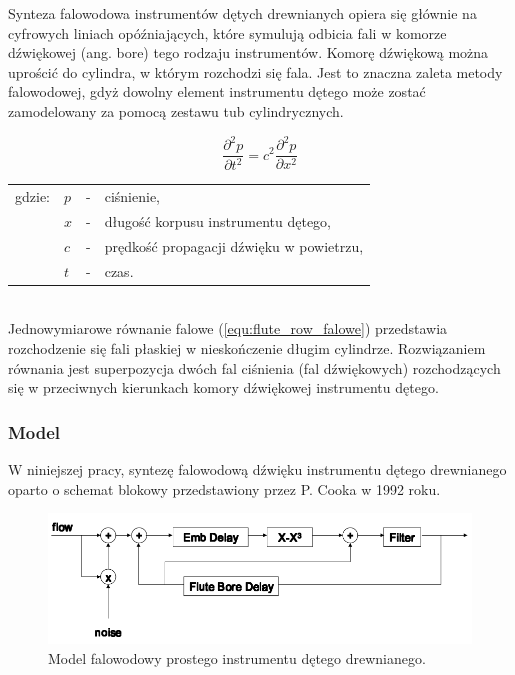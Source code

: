Synteza falowodowa instrumentów dętych drewnianych opiera się głównie na cyfrowych liniach opóźniających, które symulują odbicia fali w komorze dźwiękowej (ang. bore) tego rodzaju instrumentów. Komorę dźwiękową można uprościć do cylindra, w którym rozchodzi się fala. Jest to znaczna zaleta metody falowodowej, gdyż dowolny element instrumentu dętego może zostać zamodelowany za pomocą zestawu tub cylindrycznych.

\begin{equation} \label{equ:flute_row_falowe}
\frac{\partial^2 p}{\partial t^2} = c^{2}\frac{\partial^2 p}{\partial x^2}
\end{equation}
\begin{tabular}{ l l l l}
	gdzie: 	&	$p$ & - &  ciśnienie, \\
	&	$x$ & - &  długość korpusu instrumentu dętego,\\
	&	$c$ & - &  prędkość propagacji dźwięku w powietrzu,\\
	&	$t$ & - &  czas. \\
\end{tabular} \\

Jednowymiarowe równanie falowe (\ref{equ:flute_row_falowe}) przedstawia rozchodzenie się fali płaskiej w nieskończenie długim cylindrze. Rozwiązaniem równania jest superpozycja dwóch fal ciśnienia (fal dźwiękowych) rozchodzących się w przeciwnych kierunkach komory dźwiękowej instrumentu dętego.


\subsubsection{Model}
W niniejszej pracy, syntezę falowodową dźwięku instrumentu dętego drewnianego oparto o schemat blokowy przedstawiony przez P. Cooka w 1992 roku.

\begin{figure}[H]
	\centering
	\includegraphics[width=14cm]{grafiki/flute_waveguide_mod}
	\captionsetup{justification=centering}
	\caption{Model falowodowy prostego instrumentu dętego drewnianego.}
	\label{rys:flute_cook}
\end{figure}

